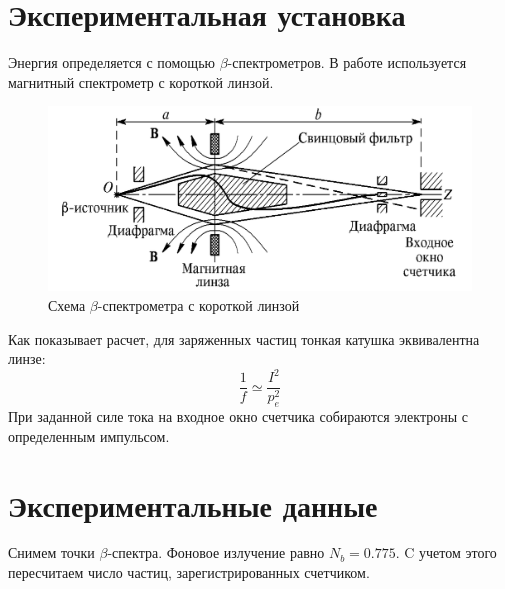 \documentclass[a4paper,12pt]{article}
\begin{document}
		\section{Экспериментальная установка}
		Энергия определяется с помощью $\beta$-спектрометров. В работе используется магнитный спектрометр с короткой линзой.
		\begin{figure}
			\centering
			\includegraphics[width=0.8\linewidth]{pic2}
			\caption{Схема $\beta$-спектрометра с короткой линзой}
		\end{figure}
		Как показывает расчет, для заряженных частиц тонкая катушка эквивалентна линзе:
		\begin{equation}
			\frac{1}{f} \simeq \frac{I^2}{p_e^2}
		\end{equation}
		При заданной силе тока на входное окно счетчика собираются электроны с определенным импульсом.

    \section{Экспериментальные данные}
    Снимем точки $\beta$-спектра. Фоновое излучение равно $N_b = 0.775$. C учетом этого пересчитаем число частиц, зарегистрированных счетчиком.
    
\end{document}
